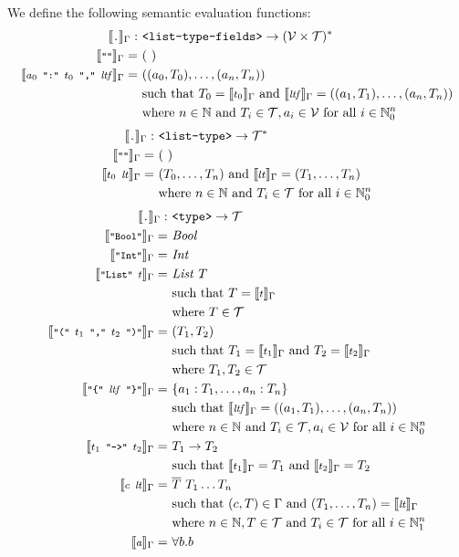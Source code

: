 \documentclass[]{scrbook}
\newcommand{\mf}[1]{\text{\texttt{#1}}}
\newcommand{\semantic}[1]{\llbracket \text{\footnotesize\texttt{#1}} \rrbracket}
\theoremstyle{definition}
\theoremstyle{definition}
\theoremstyle{definition}
\theoremstyle{remark}
\begin{document}
We define the following semantic evaluation functions: \[
\begin{aligned}
\semantic{.}_\Gamma:\ &\mf{<list-type-fields>}\to(\mathcal{V}\times\mathcal{T})^*\\
\semantic{""}_\Gamma = \ & (\ )\\
\semantic{$a_0$ ":" $t_0$ "," $\mathit{ltf}$}_\Gamma = \ & ((a_0,T_0), \dots, (a_n,T_n))\\
    &\text{such that } T_0 = \semantic{$t_0$}_\Gamma \text{ and } \semantic{$\mathit{ltf}$}_\Gamma = ((a_1,T_1), \dots, (a_n,T_n))\\
    &\text{where } n\in\mathbb{N} \text{ and } T_i\in\mathcal{T},a_i\in\mathcal{V} \text{ for all } i \in \mathbb{N}_0^n
\end{aligned}
\] \[
\begin{aligned}
\semantic{.}_\Gamma:\ &\mf{<list-type>}\to\mathcal{T}^*\\
\semantic{""}_\Gamma =\ & (\ )\\
\semantic{$t_0 \ \mathit{lt}$}_\Gamma =\ & (T_0,\dots,T_n) \text{ and } \semantic{$lt$}_\Gamma =  (T_1,\dots,T_n)\\
    &\text{where } n\in\mathbb{N} \text{ and } T_i\in\mathcal{T} \text{ for all } i \in \mathbb{N}_0^n
\end{aligned}
\] \[
\begin{aligned}
\semantic{.}_\Gamma:\ &\mf{<type>}\to\mathcal{T}\\
\semantic{"Bool"}_\Gamma =\ & \mathit{Bool}\\
\semantic{"Int"}_\Gamma =\ & \mathit{Int}\\
\semantic{"List" $t$}_\Gamma =\ & \mathit{List} \ T\\
    & \text{such that } T=\semantic{$t$}_\Gamma\\
    &\text{where } T\in\mathcal{T}\\
\semantic{"(" $t_1$ "," $t_2$ ")"}_\Gamma =\ & (T_1,T_2)\\
    & \text{such that } T_1 = \semantic{$t_1$}_\Gamma \text{ and } T_2 = \semantic{$t_2$}_\Gamma\\
    &\text{where } T_1,T_2\in\mathcal{T}\\
\semantic{"\{" $\mathit{ltf}$ "\}"}_\Gamma =\ & \{a_1:T_1,\dots,a_n:T_n\}\\
    & \text{such that }\semantic{$\mathit{ltf}$}_\Gamma = ((a_1,T_1),\dots,(a_n,T_n))\\
    &\text{where } n\in\mathbb{N} \text{ and } T_i\in\mathcal{T},a_i\in\mathcal{V} \text{ for all } i \in \mathbb{N}_0^n\\
\semantic{$t_1$ "->" $t_2$}_\Gamma =\ &T_1 \to T_2\\
    & \text{such that }\semantic{$t_1$}_\Gamma = T_1 \text{ and } \semantic{$t_2$}_\Gamma = T_2\\
\semantic{$c \ \mathit{lt}$}_\Gamma =\ & \overline{T} \ T_1 \dots T_n\\
    & \text{such that } (c,T)\in\Gamma \text{ and } (T_1,\dots,T_n) = \semantic{$\mathit{lt}$}_\Gamma\\
    &\text{where } n\in\mathbb{N} , T\in\mathcal{T} \text{ and } T_i\in\mathcal{T} \text{ for all } i \in \mathbb{N}_1^n\\
\semantic{$a$}_\Gamma =\ & \forall b.b
\end{aligned}
\]
\end{document}
